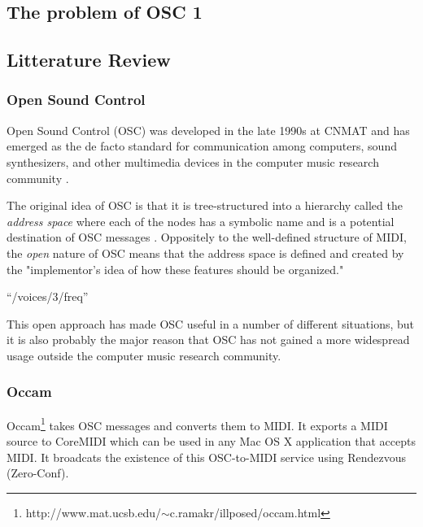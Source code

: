 \documentclass{sig-alternate}
\begin{document}
\subsection{The problem of OSC 1}

\subsection{Litterature Review} %
\label{sub:litterature_review}







\subsubsection{Open Sound Control}

Open Sound Control (OSC) was developed in the late 1990s at CNMAT and has emerged as the de facto standard for communication among computers, sound synthesizers, and other multimedia devices in the computer music research community \cite{Wright:2003}. 


The original idea of OSC is that it is tree-structured into a hierarchy called the \emph{address space} where each of the nodes has a symbolic name and is a potential destination of OSC messages \cite{Wright:2003}. Oppositely to the well-defined structure of MIDI, the \emph{open} nature of OSC means that the address space is defined and created by the "implementor’s idea of how these features should be organized." 



“/voices/3/freq” 

This open approach has made OSC useful in a number of different situations, but it is also probably the major reason that OSC has not gained a more widespread usage outside the computer music research community. 

\subsubsection{Occam}


Occam\footnote{http://www.mat.ucsb.edu/$\sim$c.ramakr/illposed/occam.html} takes OSC messages and converts them to MIDI. It exports a MIDI source to CoreMIDI which can be used in any Mac OS X application that accepts MIDI. It broadcats the existence of this OSC-to-MIDI service using Rendezvous (Zero-Conf).
\end{document}
